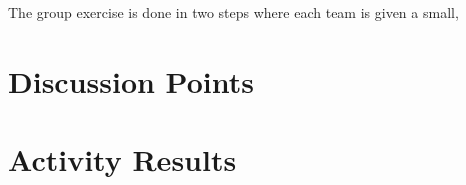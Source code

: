 \documentclass[conference]{IEEEtran}
\begin{document}
{%


The group exercise is done in two steps where each team is given a small, 

















\section{Discussion Points}
\label{sec: Discussion Points}














\section{Activity Results}
\label{sec: activityresults}

}
\end{document}
